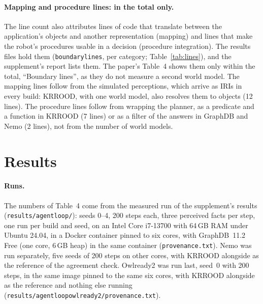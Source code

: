 \documentclass[10pt]{article}
\newcommand{\brkunderscore}{\textunderscore\allowbreak}
\newcommand{\code}[1]{{\let\_\brkunderscore\texttt{#1}}}
\newcommand{\file}[1]{{\let\_\brkunderscore\texttt{#1}}}
\begin{document}
\paragraph{Mapping and procedure lines: in the total only.} The line count also attributes lines of code that
translate between the application's objects and another representation (mapping) and lines that make the robot's
procedures usable in a decision (procedure integration). The results files hold them (\code{boundary\_lines}, per
category; Table~\ref{tab:lines}), and the supplement's report lists them. The paper's Table~4 shows them only within
the total, ``Boundary lines'', as they do not measure a second world model. The mapping lines follow from the simulated perceptions, which
arrive as IRIs in every build: KRROOD, with one world model, also resolves them to objects (12 lines). The procedure
lines follow from wrapping the planner, as a predicate and a function in KRROOD (7 lines) or as a filter of the
answers in GraphDB and Nemo (2 lines), not from the number of world models.

\section{Results}
\label{sec:results}

\paragraph{Runs.} The numbers of Table~4 come from the measured run of the supplement's results
(\file{results/agent\_loop/}): seeds 0--4, 200 steps each, three perceived facts per step, one run per build and
seed, on an Intel Core i7-13700 with 64\,GB RAM under Ubuntu 24.04, in a Docker container pinned to six cores, with
GraphDB~11.2 Free (one core, 6\,GB heap) in the same container (\file{provenance.txt}). Nemo was run separately, five seeds
of 200 steps on other cores, with KRROOD alongside as the reference of the agreement check. Owlready2 was run last,
seed~0 with 200 steps, in the same image pinned to the same six cores, with KRROOD alongside as the reference and
nothing else running (\file{results/agent\_loop\_owlready2/provenance.txt}).
\end{document}

